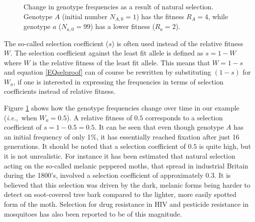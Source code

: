 \documentclass[11pt,a4paper]{book}
\newcommand{\ie}{\emph{i.e.},\ }
\begin{document}
\begin{figure}[!t]
\begin{center}
\caption{\small Change in genotype frequencies as a result of natural selection. Genotype $A$ (initial number $N_{A,0}=1$) has the fitness $R_A=4$, while genotype $a$ ($N_{a,0}=99$) has a lower fitness ($R_a=2$).}
\label{FIGnatselproof}
\end{center}
\end{figure}


The so-called selection coefficient ($s$) is often used instead of the relative fitness $W$. The selection coefficient against the least fit allele is defined as $s=1-W$ where $W$ is the relative fitness of the least fit allele. This means that $W=1-s$ and equation \ref{EQselproof} can of course be rewritten by substituting $(1-s)$ for $W_a$, if one is interested in expressing the frequencies in terms of selection coefficients instead of relative fitness. 


Figure \ref{FIGnatselproof} shows how the genotype frequencies change over time in our example  (\ie when $W_a=0.5$). A relative fitness of $0.5$ corresponds to a selection coefficient of $s=1-0.5=0.5$. It can be seen that even though genotype $A$ has an initial frequency of only 1\%, it has essentially reached fixation after just 16 generations. It should be noted that a selection coefficient of $0.5$ is quite high, but it is not unrealistic. For instance it has been estimated that natural selection acting on the so-called melanic peppered moths, that spread in industrial Britain during the 1800's, involved a selection coefficient of approximately $0.3$. It is believed that this selection was driven by the dark, melanic forms being harder to detect on soot-covered tree bark compared to the lighter, more easily spotted form of the moth. Selection for drug resistance in HIV and pesticide resistance in mosquitoes has also been reported to be of this magnitude. 
\end{document}

